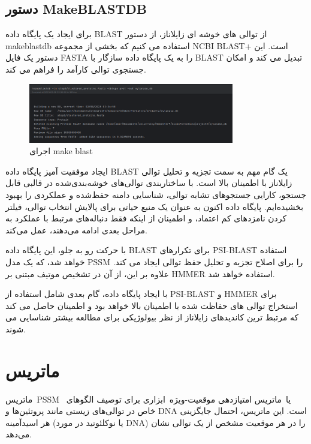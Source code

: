             \subsection*{دستور MakeBLASTDB}
                برای ایجاد یک پایگاه داده BLAST از توالی های خوشه ای زایلاناز، از دستور makeblastdb استفاده می کنیم که بخشی از مجموعه NCBI BLAST+ است. این دستور یک فایل FASTA را به یک پایگاه داده سازگار با BLAST تبدیل می کند و امکان جستجوی توالی کارآمد را فراهم می کند.
                \begin{figure}[H]
                    \centering
                    \includegraphics[width=0.8\textwidth]{images/make_blast.png} %
                    \caption{اجرای make blast}
                    \label{fig:make_blast}
                \end{figure}

                ایجاد موفقیت آمیز پایگاه داده BLAST یک گام مهم به سمت تجزیه و تحلیل توالی زایلاناز با اطمینان بالا است. با ساختاربندی توالی‌های خوشه‌بندی‌شده در قالبی قابل جستجو، کارایی جستجوهای تشابه توالی، شناسایی دامنه حفظ‌شده و عملکردی را بهبود بخشیده‌ایم. پایگاه داده اکنون به عنوان یک منبع حیاتی برای پالایش انتخاب توالی، فیلتر کردن نامزدهای کم اعتماد، و اطمینان از اینکه فقط دنباله‌های مرتبط با عملکرد به مراحل بعدی ادامه می‌دهند، عمل می‌کند.

                با حرکت رو به جلو، این پایگاه داده BLAST برای تکرارهای PSI-BLAST استفاده خواهد شد، که یک مدل PSSM را برای اصلاح تجزیه و تحلیل حفظ توالی ایجاد می کند. علاوه بر این، از آن در تشخیص موتیف مبتنی بر 
                HMMER 
                استفاده خواهد شد.

                با ایجاد پایگاه داده، گام بعدی شامل استفاده از PSI-BLAST و HMMER برای استخراج توالی های حفاظت شده با اطمینان بالا خواهد بود و اطمینان حاصل می کند که مرتبط ترین کاندیدهای زایلاناز از نظر بیولوژیکی برای مطالعه بیشتر شناسایی می شوند.
        \section{ماتریس 
        }
            ماتریس PSSM  یا ماتریس امتیازدهی موقعیت-ویژه ابزاری برای توصیف الگوهای خاص در توالی‌های زیستی مانند پروتئین‌ها و DNA است. این ماتریس، احتمال جایگزینی هر اسیدآمینه (یا نوکلئوتید در مورد DNA) را در هر موقعیت مشخص از یک توالی نشان می‌دهد.
